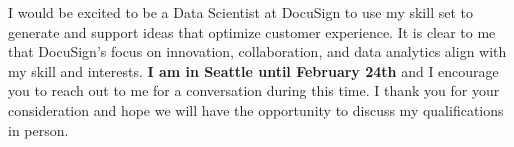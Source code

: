 \documentclass[11pt, a4paper]{awesome-cv}
\begin{document}
\begin{cvletter}
I would be excited to be a Data Scientist at DocuSign to use my skill set to generate and support ideas that optimize customer experience. It is clear to me that DocuSign's focus on innovation, collaboration, and data analytics align with my skill and interests. \textbf{I am in Seattle until February 24th} and I encourage you to reach out to me for a conversation during this time. I thank you for your consideration and hope we will have the opportunity to discuss my qualifications in person.
\end{cvletter}

\makeletterclosing
\end{document}
